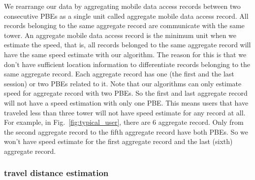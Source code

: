 We rearrange our data by aggregating mobile data access records between two consecutive PBEs as a single unit called aggregate mobile data access record. All records belonging to the same aggregate record are communicate with the same tower. An aggregate mobile data access record is the minimum unit when we estimate the speed, that is, all records belonged to the same aggregate record will have the same speed estimate with our algorithm. The reason for this is that we don't have sufficient location information to differentiate records belonging to the same aggregate record. Each aggregate record has one (the first and the last session) or two PBEs related to it. Note that our algorithms can only estimate speed for aggregate record with two PBEs. So the first and last aggregate record will not have a speed estimation with only one PBE. This means users that have traveled less than three tower will not have speed estimate for any record at all. For example, in Fig.~\ref{fig:typical_user}, there are 6 aggregate record. Only from the second aggregate record to the fifth aggregate record have both PBEs. So we won't have speed estimate for the first aggregate record and the last (sixth) aggregate record. 

\subsubsection{travel distance estimation}

